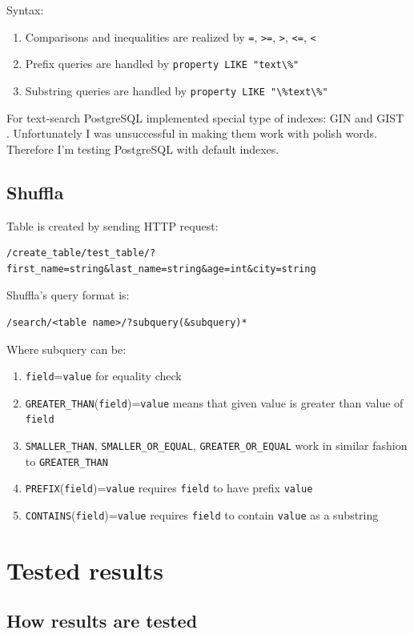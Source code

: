 \documentclass[10pt,a4paper]{article}
\begin{document}
Syntax:
\begin{enumerate}
\item Comparisons and inequalities are realized by \verb|=|, \verb|>=|, \verb|>|, \verb|<=|, \verb|<|
\item Prefix queries are handled by \verb|property LIKE "text\%"|
\item Substring queries are handled by \verb|property LIKE "\%text\%"|
\end{enumerate}

For text-search PostgreSQL implemented special type of indexes: GIN \cite{PSQLGIN} and GIST \cite{PSQLGIST}. Unfortunately I was unsuccessful in making them work with polish words. Therefore I'm testing PostgreSQL with default indexes.

\subsection{Shuffla}

Table is created by sending HTTP request:
\begin{verbatim}
/create_table/test_table/?first_name=string&last_name=string&age=int&city=string
\end{verbatim}
Shuffla's query format is:

\begin{verbatim}
/search/<table name>/?subquery(&subquery)*
\end{verbatim}
Where subquery can be:
\begin{enumerate}
\item \verb|field|=\verb|value| for equality check
\item \verb|GREATER_THAN|(\verb|field|)=\verb|value| means that given value is greater than value of \verb|field| 
\item \verb|SMALLER_THAN|, \verb|SMALLER_OR_EQUAL|, \verb|GREATER_OR_EQUAL| work in similar fashion to \verb|GREATER_THAN|
\item \verb|PREFIX|(\verb|field|)=\verb|value| requires \verb|field| to have prefix \verb|value|
\item \verb|CONTAINS|(\verb|field|)=\verb|value| requires \verb|field| to contain \verb|value| as a substring
\end{enumerate}


\section{Tested results}

\subsection{How results are tested}
\end{document}
